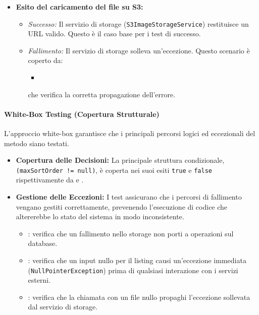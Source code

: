 \begin{itemize}
\begin{itemize}
    \end{itemize}
    \item \textbf{Esito del caricamento del file su S3:}
    \begin{itemize}
        \item \textit{Successo:} Il servizio di storage (\texttt{S3ImageStorageService}) restituisce un URL valido. Questo è il caso base per i test di successo.
        \item \textit{Fallimento:} Il servizio di storage solleva un'eccezione. Questo scenario è coperto da:
        \begin{itemize}
        	\item {}
        \end{itemize} che verifica la corretta propagazione dell'errore.
    \end{itemize}
\end{itemize}

\paragraph{White-Box Testing (Copertura Strutturale)}
L'approccio white-box garantisce che i principali percorsi logici ed eccezionali del metodo siano testati.
\begin{itemize}
    \item \textbf{Copertura delle Decisioni:} La principale struttura condizionale, \texttt{(maxSortOrder != null)}, è coperta nei suoi esiti \texttt{true} e \texttt{false} rispettivamente da  e .
    \item \textbf{Gestione delle Eccezioni:} I test assicurano che i percorsi di fallimento vengano gestiti correttamente, prevenendo l'esecuzione di codice che altererebbe lo stato del sistema in modo inconsistente.
    \begin{itemize}
        \item {}: verifica che un fallimento nello storage non porti a operazioni sul database.
        \item {}: verifica che un input nullo per il listing causi un'eccezione immediata (\texttt{NullPointerException}) prima di qualsiasi interazione con i servizi esterni.
        \item {}: verifica che la chiamata con un file nullo propaghi l'eccezione sollevata dal servizio di storage.
    \end{itemize}
\end{itemize}

